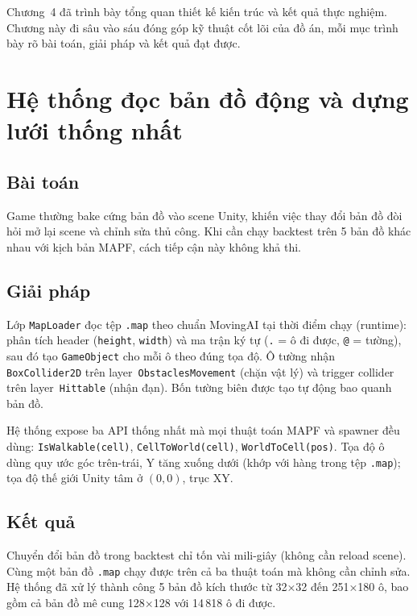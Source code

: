 \documentclass[../DoAn.tex]{subfiles}
\begin{document}
Chương~4 đã trình bày tổng quan thiết kế kiến trúc và kết quả thực nghiệm. Chương này
đi sâu vào sáu đóng góp kỹ thuật cốt lõi của đồ án, mỗi mục trình bày rõ bài toán,
giải pháp và kết quả đạt được.

\section{Hệ thống đọc bản đồ động và dựng lưới thống nhất}
\label{section:5.1}

\subsection*{Bài toán}
Game thường bake cứng bản đồ vào scene Unity, khiến việc thay đổi bản đồ đòi hỏi
mở lại scene và chỉnh sửa thủ công. Khi cần chạy backtest trên 5 bản đồ khác nhau
với kịch bản MAPF, cách tiếp cận này không khả thi.

\subsection*{Giải pháp}
Lớp \texttt{MapLoader} đọc tệp \texttt{.map} theo chuẩn MovingAI tại thời điểm
chạy (runtime): phân tích header (\texttt{height}, \texttt{width}) và ma trận ký tự
(\texttt{.} = ô đi được, \texttt{@} = tường), sau đó tạo \texttt{GameObject} cho mỗi
ô theo đúng tọa độ. Ô tường nhận \texttt{BoxCollider2D} trên layer~\texttt{ObstaclesMovement}
(chặn vật lý) và trigger collider trên layer~\texttt{Hittable} (nhận đạn). Bốn tường
biên được tạo tự động bao quanh bản đồ.

Hệ thống expose ba API thống nhất mà mọi thuật toán MAPF và spawner đều dùng:
\texttt{IsWalkable(cell)}, \texttt{CellToWorld(cell)}, \texttt{WorldToCell(pos)}.
Tọa độ ô dùng quy ước góc trên-trái, Y tăng xuống dưới (khớp với hàng trong tệp
\texttt{.map}); tọa độ thế giới Unity tâm ở $(0,0)$, trục XY.

\subsection*{Kết quả}
Chuyển đổi bản đồ trong backtest chỉ tốn vài mili-giây (không cần reload scene).
Cùng một bản đồ \texttt{.map} chạy được trên cả ba thuật toán mà không cần chỉnh sửa.
Hệ thống đã xử lý thành công 5 bản đồ kích thước từ 32×32 đến 251×180 ô, bao gồm
cả bản đồ mê cung 128×128 với 14\,818 ô đi được.

\end{document}
